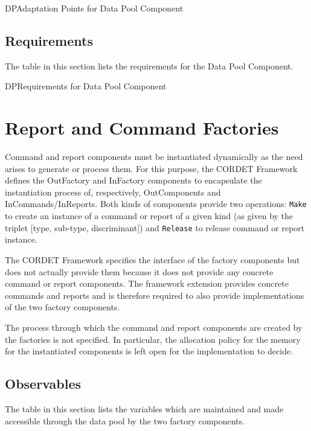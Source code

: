 \documentclass[a4paper,10pt]{article}
\let\stdsection\section
\renewcommand\section{\newpage\stdsection}
\newenvironment{cr_req}[2]
{
\begin{longtable}{|l|p{11.8cm}|}
\caption{#2}\label{tab:Req-#1} \\
\hline
\rowcolor{light-gray}
\textbf{Req. ID} & \textbf{Requirement Text}\\
\hline\hline
\endfirsthead
\rowcolor{light-gray}
\textbf{Req. ID} & \textbf{Requirement Text}\\
\hline\hline
\endhead
\DTLforeach*[\DTLiseq{\cat}{#1}]{dbReq}{\cat=Category,\type=Type,\id=Id,\reqText=Text}
{\DTLiffirstrow{}{\\\hline}P-\cat-\id/\type & \textit{\reqText}}\\\hline
}
{\end{longtable}}
\newenvironment{cr_ap}[2]
{
\begin{longtable}{|l|p{4.7cm}|p{6.9cm}|}
\caption{#2}\label{tab:AP-#1} \\
\hline
\rowcolor{light-gray}
\textbf{AP ID} & \textbf{Adaptation Point} & \textbf{Default Value}\\
\hline\hline
\endfirsthead
\rowcolor{light-gray}
\textbf{AP ID} & \textbf{Adaptation Point} & \textbf{Default Value}\\
\hline\hline
\endhead
\DTLforeach*[\DTLiseq{\cat}{#1}]{dbAP}{\cat=Category,\origin=Origin,\id=Id,\ap=AP,\defValue=DefValue}
{\DTLiffirstrow{}{\\\hline}P-\cat-\id & \ap\ (\origin) & \defValue}\\\hline
}
{\end{longtable}}
\begin{document}
\begin{cr_ap}{DP}{Adaptation Points for Data Pool Component}
\end{cr_ap}

\subsection{Requirements}
The table in this section lists the requirements for the Data Pool Component.

\begin{cr_req}{DP}{Requirements for Data Pool Component}
\end{cr_req}

\section{Report and Command Factories}\label{sec:repCmdFactories}
Command and report components must be instantiated dynamically as the need arises to generate or process them. For this purpose, the CORDET Framework defines the OutFactory and InFactory components to encapsulate the instantiation process of, respectively, OutComponents and InCommands/InReports. Both kinds of components provide two operations: \texttt{Make} to create an instance of a command or report of a given kind (as given by the triplet [type, sub-type, discriminant]) and \texttt{Release} to release command or report instance.

The CORDET Framework specifies the interface of the factory components but does not actually provide them because it does not provide any concrete command or report components. The framework extension provides concrete commands and reports and is therefore required to also provide implementations of the two factory components.

The process through which the command and report components are created by the factories is not specified. In particular, the allocation policy for the memory for the instantiated components is left open for the implementation to decide.

\subsection{Observables}
The table in this section lists the variables which are maintained and made accessible through the data pool by the two factory components.
\end{document}
